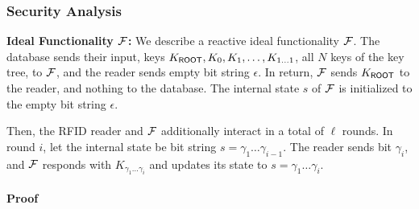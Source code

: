 \subsubsection{Security Analysis}
{\bf Ideal Functionality ${\mathcal{F}}$:}
We describe a reactive ideal functionality ${\mathcal{F}}$.  The database sends
their input, keys $K_{\mathsf{ROOT}},K_0,K_1,\ldots,K_{1\ldots{}1}$, all $N$
keys of the key tree, to ${\mathcal{F}}$, and the reader sends empty bit string
$\epsilon$. In return, ${\mathcal{F}}$ sends $K_{\mathsf{ROOT}}$ to the reader, and
nothing to the database.  The internal state $s$ of ${\mathcal{F}}$ is
initialized to the empty bit string $\epsilon$.

Then, the RFID reader and ${\mathcal{F}}$ additionally interact in a total of
$\ell$ rounds. In round $i$, let the internal state be bit string
$s=\gamma_1\ldots{}\gamma_{i-1}$. The reader sends bit $\gamma_i$, and
${\mathcal{F}}$ responds with $K_{\gamma_1\ldots\gamma_{i}}$ and updates its
state to $s=\gamma_1\ldots\gamma_{i}$.


\paragraph{Proof}

